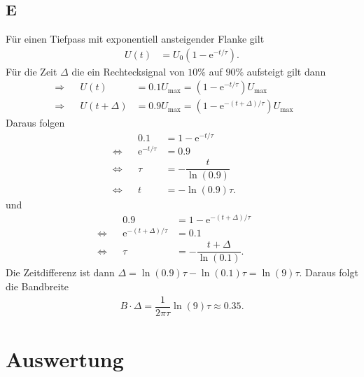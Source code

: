 \documentclass[a4paper,12pt]{article}
\numberwithin{equation}{section}
\begin{document}
\subsection{E}
Für einen Tiefpass mit exponentiell ansteigender Flanke gilt
\begin{align} 
        U\left(t\right)&=U_0\left(1-\text{e}^{-t/\tau }\right)
.\end{align} 
Für die Zeit $\Delta $ die ein Rechtecksignal von $10\%$ auf $90\%$ aufsteigt gilt dann
\begin{align} 
        \Rightarrow &&U\left(t\right)&=0.1U_{\text{max}}=\left(1-\text{e}^{-t/\tau }\right)U_{\text{max}}&&\\
        \Rightarrow &&U\left(t+\Delta \right)&=0.9U_{\text{max}}=\left(1-\text{e}^{-\left(t+\Delta \right)/\tau }\right)U_{\text{max}}&&
\end{align} 
Daraus folgen
\begin{align} 
        &&0.1&=1-\text{e}^{-t/\tau }&&\\
        \Leftrightarrow &&\text{e}^{-t/\tau }&=0.9&&\nonumber \\
        \Leftrightarrow &&\tau &=-\dfrac{t}{\ln\left(0.9\right)}&&\nonumber \\
        \Leftrightarrow &&t&=-\ln(0.9)\tau. &&\label{eq:t}
\end{align} 
und 
\begin{align} 
        &&0.9&=1-\text{e}^{-\left(t+\Delta \right)/\tau }&&\\
        \Leftrightarrow &&\text{e}^{-\left(t+\Delta \right)/\tau }&=0.1&&\nonumber \\
        \Leftrightarrow &&\tau &=-\dfrac{t+\Delta }{\ln\left(0.1\right)}.&&\label{eq:delta}
\end{align} 
Die Zeitdifferenz ist dann $\Delta =\ln(0.9)\tau -\ln(0.1)\tau =\ln(9)\tau $.
Daraus folgt die Bandbreite
\begin{align} 
        B\cdot \Delta =\dfrac{1}{2\pi \tau }\ln(9)\tau \approx 0.35
.\end{align} 

\newpage
\section{Auswertung}

\clearpage
\listoffigures
\listoftables




\end{document}
